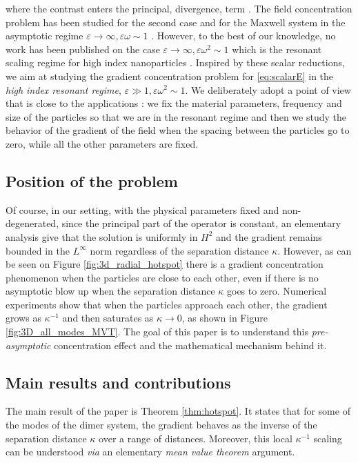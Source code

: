 \documentclass[10pt]{article}
\numberwithin{equation}{section}
\begin{document}
where the contrast enters the principal, divergence, term \cite{moiola2019acoustic}.  The field concentration problem has been studied for the second case \cite{deng2022optimal} and for the Maxwell system in the asymptotic regime $\varepsilon\to \infty,  \varepsilon\omega \sim 1$ \cite{deng2022gradient}. 
However,  to the best of our knowledge,  no work has been published on the case $\varepsilon \to \infty ,  \varepsilon\omega^2 \sim 1$ which is the resonant scaling regime for high index nanoparticles \cite{meklachi2018asymptotic,ammari2023mathematical}. Inspired by these scalar reductions,  we aim at studying the gradient concentration problem for \eqref{eq:scalarE} in the \emph{high index resonant regime}, $\varepsilon\gg 1 ,  \varepsilon\omega^2 \sim 1$.  We deliberately adopt a point of view that is close to the applications : we fix the material parameters, frequency and size of the particles so that we are in the resonant regime and then we study the behavior of the gradient of the field when the spacing between the particles go to zero, while all the other parameters are fixed. 

\subsection{Position of the problem}
Of course, in our setting, with the physical parameters fixed and non-degenerated,  since the principal part of the operator is constant, an elementary analysis give that the solution is uniformly in $H^2$ and the gradient remains bounded in the $L^\infty$ norm regardless of the separation distance $\kappa$.  However, as can be seen on Figure \ref{fig:3d_radial_hotspot} there is a gradient concentration phenomenon when the particles are close to each other,  even if there is no asymptotic blow up when the separation distance $\kappa$ goes to zero.  Numerical experiments show that when the particles approach each other,  the gradient grows as $\kappa^{-1}$ and then saturates as $\kappa\to 0$, as shown in Figure \ref{fig:3D_all_modes_MVT}. The goal of this paper is to understand this \emph{pre-asymptotic} concentration effect and the mathematical mechanism behind it. 

\subsection{Main results and contributions}

The main result of the paper is Theorem \ref{thm:hotspot}.  It states that for some of the modes of the dimer system,  the gradient behaves as the inverse of the separation distance $\kappa$ over a range of distances.  Moreover,  this local  $\kappa^{-1}$ scaling can be understood \emph{via} an elementary \emph{mean value theorem} argument. 
\end{document}
